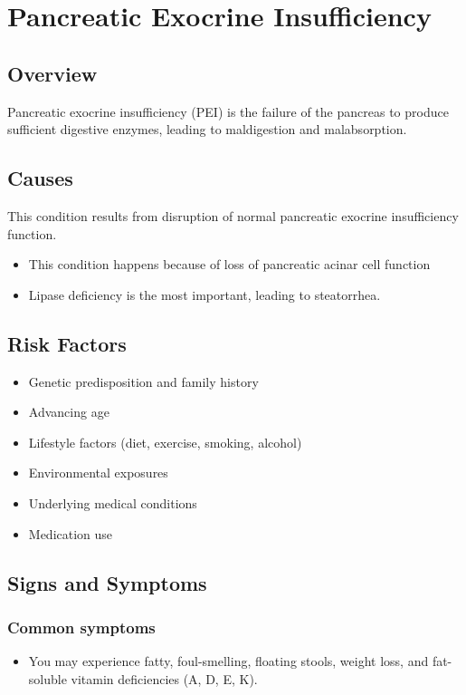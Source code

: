 \chapter{Pancreatic Exocrine Insufficiency}
\label{sec:Pancreatic Exocrine Insufficiency}

\section{Overview}
Pancreatic exocrine insufficiency (PEI) is the failure of the pancreas to produce sufficient digestive enzymes, leading to maldigestion and malabsorption.
\section{Causes}
This condition results from disruption of normal pancreatic exocrine insufficiency function.

\begin{itemize}[noitemsep]
  \item This condition happens because of loss of pancreatic acinar cell function
  \item Lipase deficiency is the most important, leading to steatorrhea.
\end{itemize}
\section{Risk Factors}


\begin{itemize}[noitemsep]
  \item Genetic predisposition and family history
  \item Advancing age
  \item Lifestyle factors (diet, exercise, smoking, alcohol)
  \item Environmental exposures
  \item Underlying medical conditions
  \item Medication use
\end{itemize}
\section{Signs and Symptoms}

\subsection{Common symptoms}
\begin{itemize}[noitemsep]
  \item You may experience fatty, foul-smelling, floating stools, weight loss, and fat-soluble vitamin deficiencies (A, D, E, K). 
  \end{itemize}

